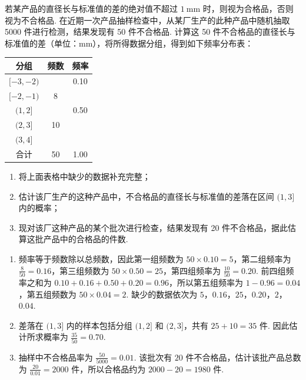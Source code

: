 \begin{problem}
若某产品的直径长与标准值的差的绝对值不超过 \(1\mathrm{~mm}\) 时，则视为合格品，否则视为不合格品. 在近期一次产品抽样检查中，从某厂生产的此种产品中随机抽取 5000 件进行检测，结果发现有 50 件不合格品. 计算这 50 件不合格品的直径长与标准值的差（单位：mm），将所得数据分组，得到如下频率分布表：

\begin{center}
\begin{tabular}{c|c|c}
\hline
分组 & 频数 & 频率 \\
\hline
\([-3,-2)\) &\fillinblank{} & 0.10 \\
\([-2,-1)\) & 8 &\fillinblank{} \\
\((1,2]\) &\fillinblank{} & 0.50 \\
\((2,3]\) & 10 &\fillinblank{} \\
\((3,4]\) &\fillinblank{} &\fillinblank{} \\
\hline
合计 & 50 & 1.00 \\
\hline
\end{tabular}
\end{center}

\begin{enumerate}
\item 将上面表格中缺少的数据补充完整；
\item 估计该厂生产的这种产品中，不合格品的直径长与标准值的差落在区间 \((1,3]\) 内的概率；
\item 现对该厂这种产品的某个批次进行检查，结果发现有 20 件不合格品，据此估算这批产品中的合格品的件数.
\end{enumerate}
\end{problem}

\begin{solution}
\begin{enumerate}
\item 频率等于频数除以总频数，因此第一组频数为 \(50\times0.10=5\)，第二组频率为 \(\frac{8}{50}=0.16\)，第三组频数为 \(50\times0.50=25\)，第四组频率为 \(\frac{10}{50}=0.20\). 前四组频率之和为 \(0.10+0.16+0.50+0.20=0.96\)，所以第五组频率为 \(1-0.96=0.04\)，第五组频数为 \(50\times0.04=2\). 缺少的数据依次为 \(5\)，\(0.16\)，\(25\)，\(0.20\)，\(2\)，\(0.04\).
\item 差落在 \((1,3]\) 内的样本包括分组 \((1,2]\) 和 \((2,3]\)，共有 \(25+10=35\) 件. 因此估计所求概率为 \(\frac{35}{50}=0.70\).
\item 抽样中不合格品率为 \(\frac{50}{5000}=0.01\). 该批次有 \(20\) 件不合格品，估计该批产品总数为 \(\frac{20}{0.01}=2000\) 件，所以合格品约为 \(2000-20=1980\) 件.
\end{enumerate}
\end{solution}

